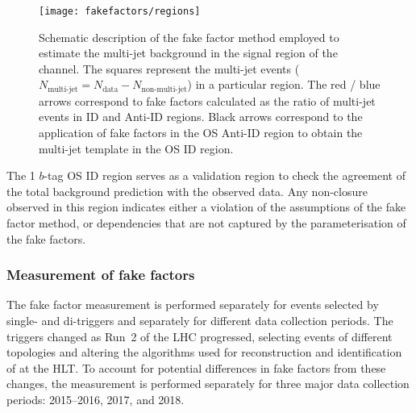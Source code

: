 \begin{figure}[htbp]
  \centering

  \texttt{[image: fakefactors/regions]}

  \caption{Schematic description of the fake factor method employed to
    estimate the multi-jet background in the signal region of the
    \hadhad channel. The squares represent the multi-jet events
    ($N_\text{multi-jet} = N_\text{data} - N_\text{non-multi-jet}$) in
    a particular region. The red / blue arrows correspond to fake
    factors calculated as the ratio of multi-jet events in ID and
    Anti-ID regions. Black arrows correspond to the application of
    fake factors in the OS Anti-ID region to obtain the multi-jet
    template in the OS ID region.}
  \label{fig:fakefactor_regions}
\end{figure}

The 1 $b$-tag OS ID region serves as a validation region to check the
agreement of the total background prediction with the observed
data. Any non-closure observed in this region indicates either a
violation of the assumptions of the fake factor method, or
dependencies that are not captured by the parameterisation of the fake
factors.



\subsubsection{Measurement of fake factors}

The fake factor measurement is performed separately for events
selected by single- and di-\tauhadvis triggers and separately for
different data collection periods. The \tauhadvis triggers changed as
Run~2 of the LHC progressed, selecting events of different topologies
and altering the algorithms used for reconstruction and identification
of \tauhadvis at the HLT. To account for potential differences in fake
factors from these changes, the measurement is performed separately
for three major data collection periods: 2015--2016, 2017, and 2018.

